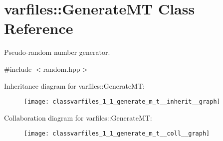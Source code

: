 \hypertarget{classvarfiles_1_1_generate_m_t}{}\section{varfiles\+:\+:Generate\+MT Class Reference}
\label{classvarfiles_1_1_generate_m_t}


Pseudo-\/random number generator.  




{\ttfamily \#include $<$random.\+hpp$>$}



Inheritance diagram for varfiles\+:\+:Generate\+MT\+:\nopagebreak
\begin{figure}[H]
\begin{center}
\leavevmode
\texttt{[image: classvarfiles\_1\_1\_generate\_m\_t\_\_inherit\_\_graph]}
\end{center}
\end{figure}


Collaboration diagram for varfiles\+:\+:Generate\+MT\+:\nopagebreak
\begin{figure}[H]
\begin{center}
\leavevmode
\texttt{[image: classvarfiles\_1\_1\_generate\_m\_t\_\_coll\_\_graph]}
\end{center}
\end{figure}
